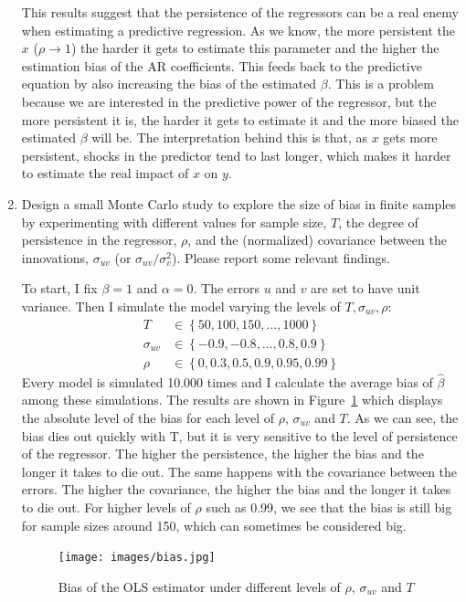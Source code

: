 \documentclass[12pt,twoside]{article}
\begin{document}
\begin{enumerate}[label = (\alph*)]
\begin{solution}
        This results suggest that the persistence of the regressors can be a real enemy when estimating a predictive regression. As we know, the more persistent the \(x\) (\(\rho \to 1\)) the harder it gets to estimate this parameter and the higher the estimation bias of the AR coefficients. This feeds back to the predictive equation by also increasing the bias of the estimated \(\beta\). This is a problem because we are interested in the predictive power of the regressor, but the more persistent it is, the harder it gets to estimate it and the more biased the estimated \(\beta\) will be. 
        The interpretation behind this is that, as \(x\) gets more persistent, shocks in the predictor tend to last longer, which makes it harder to estimate the real impact of \(x\) on \(y\).
    \end{solution}
    \item Design a small Monte Carlo study to explore the size of bias in finite samples by experimenting with different values for sample size, \(T\), the degree of persistence in the regressor, \(\rho\), and the (normalized) covariance between the innovations, \(\sigma_{uv}\) (or \(\sigma_{uv}/\sigma_v^2\)). Please report some relevant findings.
    \begin{solution}
        To start, I fix \(\beta = 1\) and \(\alpha = 0\). The errors \(u\) and \(v\) are set to have unit variance. Then I simulate the model varying the levels of \(T, \sigma_{uv}, \rho\):
        \begin{align*}
            T & \in \left\lbrace 50, 100, 150, \dots, 1000 \right\rbrace \\
            \sigma_{uv} & \in \left\lbrace -0.9, -0.8, \dots, 0.8, 0.9 \right\rbrace \\
            \rho & \in \left\lbrace 0, 0.3, 0.5, 0.9, 0.95, 0.99 \right\rbrace
        \end{align*}
        Every model is simulated 10.000 times and I calculate the average bias of \(\widehat\beta\) among these simulations. The results are shown in Figure~\ref{fig:bias} which displays the absolute level of the bias for each level of \(\rho\), \(\sigma_{uv}\) and \(T\). As we can see, the bias dies out quickly with T, but it is very sensitive to the level of persistence of the regressor. The higher the persistence, the higher the bias and the longer it takes to die out. The same happens with the covariance between the errors. The higher the covariance, the higher the bias and the longer it takes to die out. For higher levels of \(\rho\) such as 0.99, we see that the bias is still big for sample sizes around 150, which can sometimes be considered big.
        \begin{figure}[!htbp]
            \centering
            \texttt{[image: images/bias.jpg]}
            \caption{Bias of the OLS estimator under different levels of \(\rho\), \(\sigma_{uv}\) and \(T\)}
            \label{fig:bias}
        \end{figure}
    \end{solution}
\end{enumerate}
\end{document}
